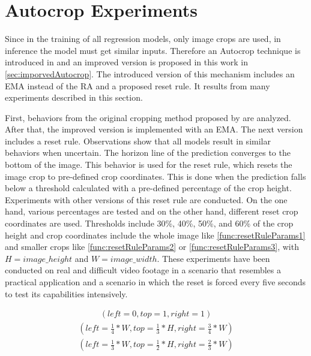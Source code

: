 \section{Autocrop Experiments}
\label{sec:autocropExperiments}

Since in the training of all regression models, only image crops are used, in inference the model must get similar inputs.
Therefore an Autocrop technique is introduced in \cite{tepNet2024} and an improved version is proposed in this work in \autoref{sec:imporvedAutocrop}.
The introduced version of this mechanism includes an \ac{EMA} instead of the \ac{RA} and a proposed reset rule.
It results from many experiments described in this section.

First, behaviors from the original cropping method proposed by \cite{tepNet2024} are analyzed.
After that, the improved version is implemented with an \ac{EMA}.
The next version includes a reset rule.
Observations show that all models result in similar behaviors when uncertain.
The horizon line of the prediction converges to the bottom of the image.
This behavior is used for the reset rule, which resets the image crop to pre-defined crop coordinates.
This is done when the prediction falls below a threshold calculated with a pre-defined percentage of the crop height.
Experiments with other versions of this reset rule are conducted.
On the one hand, various percentages are tested and on the other hand, different reset crop coordinates are used.
Thresholds include 30\%, 40\%, 50\%, and 60\% of the crop height and crop coordinates include the whole image like \autoref{func:resetRuleParams1} and smaller crops like \autoref{func:resetRuleParams2} or \autoref{func:resetRuleParams3}, with $H=image\_height$ and $W=image\_width$.
These experiments have been conducted on real and difficult video footage in a scenario that resembles a practical application and a scenario in which the reset is forced every five seconds to test its capabilities intensively.

\begin{align}
    (left=0, top=1, right=1)
    \label{func:resetRuleParams1}
\end{align}
\begin{align}
    (left=\frac{1}{4}*W, top=\frac{1}{3}*H, right=\frac{3}{4}*W)
    \label{func:resetRuleParams2}
\end{align}
\begin{align}
    (left=\frac{1}{3}*W, top=\frac{1}{2}*H, right=\frac{2}{3}*W)
    \label{func:resetRuleParams3}
\end{align}


